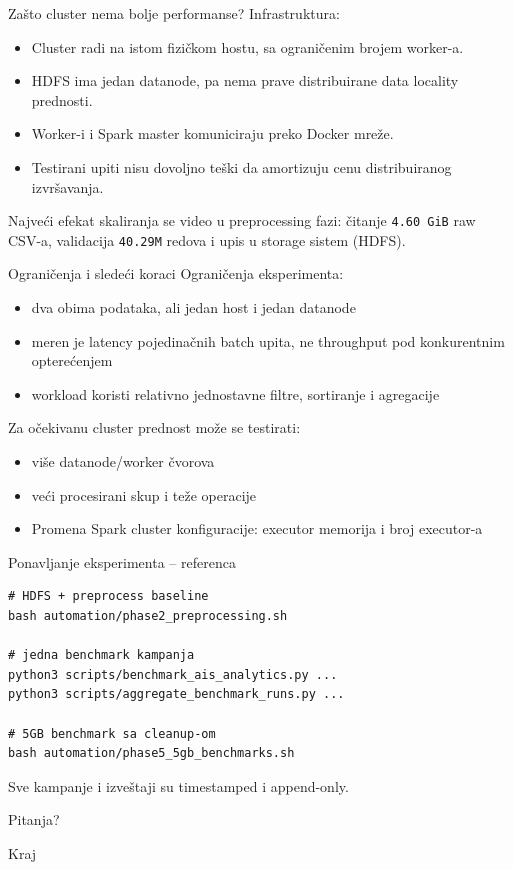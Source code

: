 \documentclass[aspectratio=169,11pt]{beamer}
\newcommand{\code}[1]{\texttt{\small #1}}
\begin{document}
\begin{frame}{Zašto cluster nema bolje performanse?}
  Infrastruktura:
  \begin{itemize}
    \item Cluster radi na istom fizičkom hostu, sa ograničenim brojem worker-a.
    \item HDFS ima jedan datanode, pa nema prave distribuirane data locality prednosti.
    \item Worker-i i Spark master komuniciraju preko Docker mreže.
    \item Testirani upiti nisu dovoljno teški da amortizuju cenu distribuiranog izvršavanja.
  \end{itemize}

  \vspace{0.3cm}
  Najveći efekat skaliranja se video u preprocessing fazi: čitanje \code{4.60 GiB} raw CSV-a,
  validacija \code{40.29M} redova i upis u storage sistem (HDFS).
\end{frame}

\begin{frame}{Ograničenja i sledeći koraci}
  Ograničenja eksperimenta:
  \begin{itemize}
    \item dva obima podataka, ali jedan host i jedan datanode
    \item meren je latency pojedinačnih batch upita, ne throughput pod konkurentnim opterećenjem
    \item workload koristi relativno jednostavne filtre, sortiranje i agregacije
  \end{itemize}

  \vspace{0.3cm}
  Za očekivanu cluster prednost može se testirati:
  \begin{itemize}
    \item više datanode/worker čvorova
    \item veći procesirani skup i teže operacije
    \item Promena Spark cluster konfiguracije: executor memorija i broj executor-a
  \end{itemize}
\end{frame}

\begin{frame}[fragile]{Ponavljanje eksperimenta -- referenca}

  \begin{verbatim}
# HDFS + preprocess baseline
bash automation/phase2_preprocessing.sh

# jedna benchmark kampanja
python3 scripts/benchmark_ais_analytics.py ...
python3 scripts/aggregate_benchmark_runs.py ...

# 5GB benchmark sa cleanup-om
bash automation/phase5_5gb_benchmarks.sh
  \end{verbatim}

  Sve kampanje i izveštaji su timestamped i append-only.
\end{frame}

\begin{frame}
  \centering
  {\Huge Pitanja?}

  \vspace{0.8cm}
  {\Large Kraj}
\end{frame}
\end{document}
